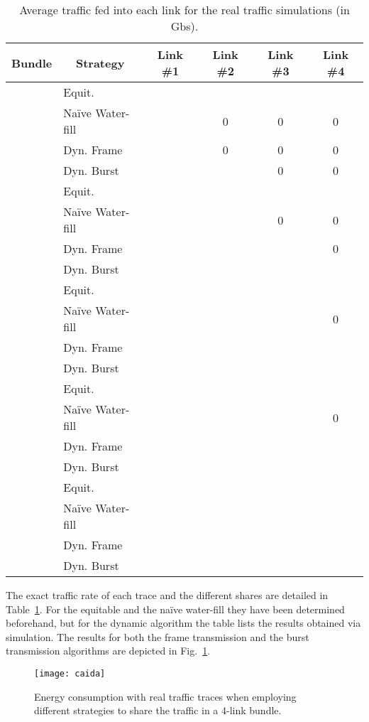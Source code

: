 \documentclass[journal,english,twocolumn,10pt,letterpaper]{IEEEtran}
\newcommand{\added}[1]{{#1}}
\begin{document}
\begin{table}
  \centering
\begin{tabular}{rlcccc}
      \multicolumn{1}{c}{Bundle} &
      \multicolumn{1}{c}{Strategy} & 
      \multicolumn{1}{c}{Link \#1} & 
      \multicolumn{1}{c}{Link \#2} & 
      \multicolumn{1}{c}{Link \#3} & 
      \multicolumn{1}{c}{Link \#4} \\\hline
      & Equit. &  & & & \\
       & Naïve Water-fill &  & 0 & 0 & 0 \\
      & Dyn. Frame &  & 0 & 0 & 0\\    
      & Dyn. Burst &  &  & 0 & 0\\\hline    
      & Equit. &  & & & \\
       & Naïve Water-fill &  &  & 0 & 0 \\
      & Dyn. Frame &  &  &  & 0 \\
      & Dyn. Burst &  &  &  & \\\hline    
      & Equit. &  & & & \\
       & Naïve Water-fill &  &  &  & 0 \\
      & Dyn. Frame &  &  &  &  \\
      & Dyn. Burst &  &  &  & \\\hline     
      & Equit. &  & & & \\
       & Naïve Water-fill &  &  &  & 0 \\
      & Dyn. Frame &  &  &  &  \\
      & Dyn. Burst &  &  &  & \\\hline     
      & Equit. &  & & & \\
       & Naïve Water-fill &  &  &  &  \\
      & Dyn. Frame &  &  &  &  \\
      & Dyn. Burst &  &  &  & \\\hline     
    \end{tabular}
\caption{Average traffic fed into each link for the real traffic simulations
    (in Gbs).}
  \label{tab:caida}
\end{table}
The exact traffic rate of each trace and the different shares are detailed in
Table~\ref{tab:caida}. For the equitable and the naïve water-fill they have
been determined beforehand, but for the dynamic algorithm the table lists the
results obtained via simulation. The results for both the frame transmission
and the burst transmission algorithms are depicted in
\added{Fig.}~\ref{fig:caida}.
\begin{figure}
  \centering
  \texttt{[image: caida]}
  \caption{Energy consumption with real traffic traces when employing
    different strategies to share the traffic in a 4-link bundle.}
  \label{fig:caida}
\end{figure}
\end{document}
